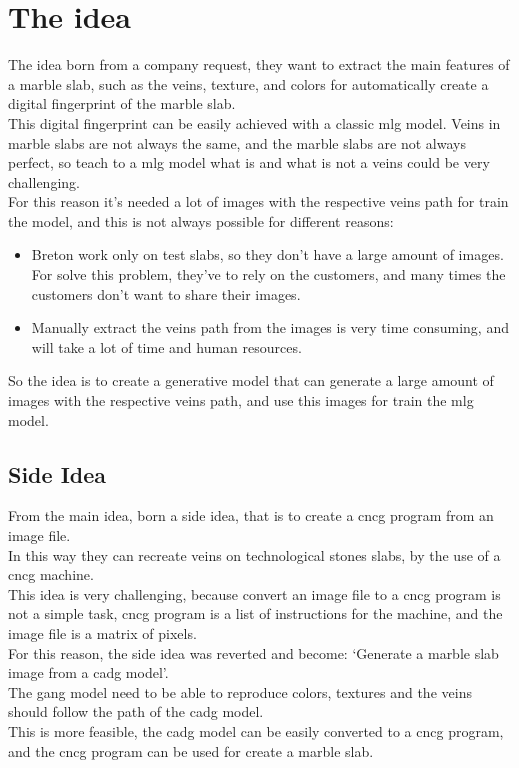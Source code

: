 \section{The idea}
The idea born from a company request, they want to extract the main features of a marble slab, such as the veins, texture, and colors for automatically create a digital fingerprint of the marble slab.\\
This digital fingerprint can be easily achieved with a classic \gls{mlg} model. Veins in marble slabs are not always the same, and the marble slabs are not always perfect, so teach to a \gls{mlg} model what is and what is not a veins could be very challenging.\\
For this reason it's needed a lot of images with the respective veins path for train the model, and this is not always possible for different reasons:
\begin{itemize}
    \item Breton work only on test slabs, so they don't have a large amount of images. 
    For solve this problem, they've to rely on the customers, and many times the customers don't want to share their images.
    \item Manually extract the veins path from the images is very time consuming, and will take a lot of time and human resources.
\end{itemize}
So the idea is to create a generative model that can generate a large amount of images with the respective veins path, and use this images for train the \gls{mlg} model.\\
\subsection{Side Idea}
From the main idea, born a side idea, that is to create a \gls{cncg} program from an image file.\\
In this way they can recreate veins on technological stones slabs, by the use of a \gls{cncg} machine.\\
This idea is very challenging, because convert an image file to a \gls{cncg} program is not a simple task, \gls{cncg} program is a list of instructions for the machine, and the image file is a matrix of pixels.\\
For this reason, the side idea was reverted and become: `Generate a marble slab image from a \gls{cadg} model'.\\
The \gls{gang} model need to be able to reproduce colors, textures and the veins should follow the path of the \gls{cadg} model.\\
This is more feasible, the \gls{cadg} model can be easily converted to a \gls{cncg} program, and the \gls{cncg} program can be used for create a marble slab.

